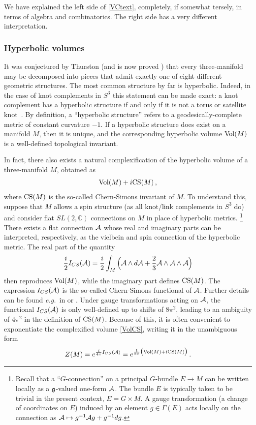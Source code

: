 \documentclass[letterpaper,12pt]{article}
\numberwithin{equation}{section}
\newcommand{\eg}{\emph{e.g.}}
\newcommand{\be}{\begin{equation}}
\newcommand{\ee}{\end{equation}}
\newcommand{\Vol}{{\rm Vol}}
\newcommand{\CS}{{\rm CS}}
\newcommand{\C}{{\mathbb{C}}}
\newcommand{\fg}{{\frak{g}}}
\newcommand{\CA}{{\cal A}}
\renewcommand{\=}{\;=\;}
\begin{document}
We have explained the left side of \eqref{VCtext}, completely, if somewhat tersely, in terms of algebra and
combinatorics. The right side has a very different interpretation.


\subsubsection*{Hyperbolic volumes}

It was conjectured by Thurston \cite{thurston-1982} (and is now proved \cite{Perelman-geometrization}) that every three-manifold may be decomposed into pieces that admit exactly one of eight different geometric structures. The most common structure by far is hyperbolic. Indeed, in the case of knot complements in $S^3$ this statement can be made exact: a knot complement has a hyperbolic structure if and only if it is not a torus or satellite knot~\cite{thurston-1982}. By definition, a ``hyperbolic structure'' refers to a geodesically-complete metric of constant curvature $-1$. If a hyperbolic structure does exist on a manifold $M$, then it is unique, and the corresponding hyperbolic volume $\Vol(M)$ is a well-defined topological invariant.

In fact, there also exists a natural complexification of the hyperbolic volume of a three-manifold $M$, obtained as
%
\be \Vol(M) + i \CS(M)\,, \label{VolCS} \ee
%
where $\CS(M)$ is the so-called Chern-Simons invariant of $M$. To understand this, suppose that $M$ allows a spin structure (as all knot/link complements in $S^3$ do) and consider flat $SL(2,\C)$ connections on $M$ in place of hyperbolic metrics.%
%
\footnote{Recall that a ``$G$-connection'' on a principal $G$-bundle $E\to M$ can be written locally as a $\fg$-valued one-form $\CA$. The bundle $E$ is typically taken to be trivial in the present context, $E=G\times M$. A gauge transformation (a change of coordinates on $E$) induced by an element $g\in\Gamma(E)$ acts locally on the connection as $\CA\mapsto g^{-1}\CA g+g^{-1}dg$.} %
%
There exists a flat connection $\CA$ whose real and imaginary parts can be interpreted, respectively, as the vielbein and spin connection of the hyperbolic metric. The real part of the quantity
%
\be \frac{i}{2}I_{CS}(\CA) = \frac{i}{2}\int_M\Big(\CA\wedge d\CA+\frac{2}{3}\CA\wedge\CA\wedge\CA\Big) \label{ICS} \ee
%
then reproduces $\Vol(M)$, while the imaginary part defines $\CS(M)$.
The expression $I_{CS}(\CA)$ is the so-called Chern-Simons functional of $\CA$.
Further details can be found \eg\ in \cite{Wit-CSGrav, witten-1991} or \cite{gukov-2003, DGLZ}.
Under gauge transformations acting on $\CA$, the functional $I_{CS}(\CA)$ is only well-defined
up to shifts of $8\pi^2$, leading to an ambiguity of $4\pi^2$ in the definition of $\CS(M)$.
Because of this, it is often convenient to exponentiate the complexified volume \eqref{VolCS},
writing it in the unambiguous form
%
\be Z(M) =  e^{\frac{i}{4\pi}I_{CS}(\CA)} = e^{\frac{1}{2\pi}\big(\Vol(M)+i\CS(M)\big)}\,. \label{Zcl} \ee
\end{document}
